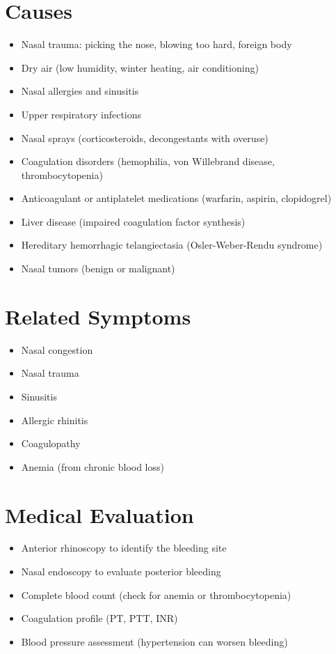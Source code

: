 \section*{Causes}
\begin{itemize}
\item Nasal trauma: picking the nose, blowing too hard, foreign body
\item Dry air (low humidity, winter heating, air conditioning)
\item Nasal allergies and sinusitis
\item Upper respiratory infections
\item Nasal sprays (corticosteroids, decongestants with overuse)
\item Coagulation disorders (hemophilia, von Willebrand disease, thrombocytopenia)
\item Anticoagulant or antiplatelet medications (warfarin, aspirin, clopidogrel)
\item Liver disease (impaired coagulation factor synthesis)
\item Hereditary hemorrhagic telangiectasia (Osler-Weber-Rendu syndrome)
\item Nasal tumors (benign or malignant)
\end{itemize}

\section*{Related Symptoms}
\begin{itemize}
\item Nasal congestion
\item Nasal trauma
\item Sinusitis
\item Allergic rhinitis
\item Coagulopathy
\item Anemia (from chronic blood loss)
\end{itemize}

\section*{Medical Evaluation}
\begin{itemize}
\item Anterior rhinoscopy to identify the bleeding site
\item Nasal endoscopy to evaluate posterior bleeding
\item Complete blood count (check for anemia or thrombocytopenia)
\item Coagulation profile (PT, PTT, INR)
\item Blood pressure assessment (hypertension can worsen bleeding)
\end{itemize}

